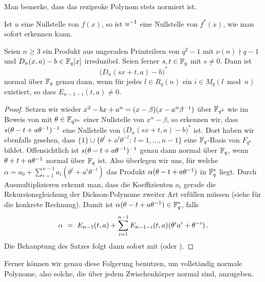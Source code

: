 \begin{bemerkung}
  Man bemerke, dass das reziproke Polynom stets normiert ist.
\end{bemerkung}

\begin{bemerkung}
  Ist $u$ eine Nullstelle von $f(x)$, so ist $u^{-1}$ eine Nullstelle von 
  $f^\ast(x)$, wie man sofort erkennen kann.
\end{bemerkung}

\begin{satz}%
  \label{satz:scheerhorn3}
  Seien $n\geq 3$ ein Produkt aus ungeraden Primteilern von 
  $q^2-1$ mit $\nu(n) \nmid q-1$ und
  $D_n(x,a)-b \in \mathbb{F}_q[x]$ irreduzibel. Seien ferner $s,t\in \mathbb{F}_q$ mit
  $s\neq 0$. Dann ist
  \[ \big(D_n(sx+t,a)-b\big)^\ast\]
  normal über $\mathbb{F}_q$ genau dann, wenn für jedes $l\in R_q(n)$ ein
  $i\in M_q(l\bmod n)$ existiert, so dass $E_{n-1-i}(t,a)\neq 0$.
\end{satz}
\begin{proof}
  Setzen wir wieder $x^2-bx+a^n = (x-\beta)(x-a^n\beta^{-1})$ über $\mathbb{F}_{q^2}$
  wie im Beweis von  mit $\theta \in \mathbb{F}_{q^{2n}}$ einer
  Nullstelle von $x^n-\beta$, so erkennen wir, dass
  $s(\theta-t+a\theta^{-1})^{-1}$ eine Nullstelle von 
  $\big(D_n(sx+t,a)-b\big)^\ast$ ist.
  Dort haben wir ebenfalls gesehen, dass
  $\{ 1\} \cup \{\theta^l+a^l\theta^{-l}:\ l=1,\ldots,n-1\}$ eine 
  $\mathbb{F}_q$-Basis von $F_{q^n}$ bildet. Offensichtlich ist
  $s(\theta-t+a\theta^{-1})^{-1}$ genau dann normal über $\mathbb{F}_q$, wenn
  $\theta+t+a\theta^{-1}$ normal über $\mathbb{F}_q$ ist. Also überlegen wir uns,
  für welche $\alpha = a_0 + \sum_{i=1}^{n-1} a_i(\theta^i+a^i\theta^{-i})$
  das Produkt $\alpha(\theta-t+a\theta^{-1})$ in $\mathbb{F}_q^\ast$ liegt.
  Durch Ausmultiplizieren erkennt man, dass die Koeffizienten $a_i$ gerade 
  die Rekursionsgleichung der Dickson-Polynome zweiter Art erfüllen müssen 
  (siehe \autocite[Beweis zu Theorem 4]{scheerhorn:1997} für die konkrete
  Rechnung). Damit ist $\alpha(\theta-t+a\theta^{-1}) \in \mathbb{F}_q^\ast$, falls
  \[ \alpha \ =\  E_{n-1}(t,a) + \sum_{i=1}^{n-1} E_{n-1-i}(t,a)
    (\theta^ia^i+\theta^{-i})\,.\]
  Die Behauptung des Satzes folgt dann sofort mit  
  (oder ).
\end{proof}


Ferner können wir genau diese Folgerung benutzen, um vollständig normale
Polynome, also solche, die über jedem Zwischenkörper normal sind, anzugeben.

